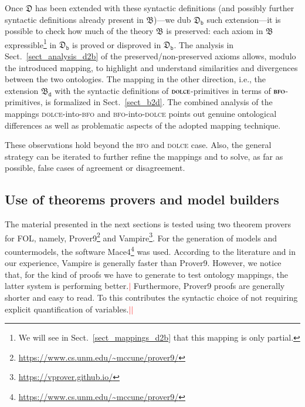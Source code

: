 \documentclass[ao]{iosart2x}
\newcommand{\nb}[1]{\textcolor{red}{$|$}\marginpar{\hspace*{-0cm}\parbox{20mm}{\scriptsize\raggedright\textcolor{red}{#1}}}}
\newcommand{\dolce}{{\textsc{dolce}}}
\newcommand{\bfo}{{\textsc{bfo}}}
\newcommand {\thdolce} {\ensuremath{\mathfrak{D}}}
\newcommand {\thbfo} {\ensuremath{\mathfrak{B}}}
\newcommand {\thbfobdmap} {\ensuremath{\mathfrak{B}_\texttt{d}}}
\newcommand {\thdolcedbmap} {\ensuremath{\mathfrak{D}_\texttt{b}}}
\begin{document}
Once {$\thdolce$} has been extended with these syntactic definitions (and possibly further syntactic definitions already present in {$\thbfo$})---we dub $\thdolcedbmap$ such extension---it is possible to check how much of the theory $\thbfo$ is preserved: each axiom in $\thbfo$ expressible\footnote{We will see in Sect.~\ref{sect_mappings_d2b} that this mapping is only partial.} in $\thdolcedbmap$ is proved or disproved in $\thdolcedbmap$. The analysis in Sect.~\ref{sect_analysis_d2b} of the preserved/non-preserved axioms allows, modulo the introduced mapping, to highlight and understand similarities and divergences between the two ontologies. The mapping in the other direction, i.e., the extension $\thbfobdmap$ with the syntactic definitions of {$\dolce$}-primitives in terms of {$\bfo$}-primitives, is formalized in Sect.~\ref{sect_b2d}. The combined analysis of the mappings {\dolce}-into-{\bfo} and {\bfo}-into-{\dolce} points out genuine ontological differences as well as problematic aspects of the adopted mapping technique. 

These observations hold beyond the {\bfo} and {\dolce} case. Also, the general strategy can be iterated to further refine the mappings and to solve, as far as possible, false cases of agreement or disagreement.

\subsection{Use of theorems provers and model builders}

The material presented in the next sections is tested using two theorem provers for FOL, namely, Prover9\footnote{\url{https://www.cs.unm.edu/~mccune/prover9/}} and Vampire\footnote{\url{https://vprover.github.io/}}. For the generation of models and countermodels, the software Mace4\footnote{\url{https://www.cs.unm.edu/~mccune/prover9/}} was used.
According to the literature \citep{Sut16} and in our experience, Vampire is generally faster than Prover9. However, we notice that, for the kind of proofs we have to generate to test ontology mappings, the latter system is performing better.\nb{CM: @Francesco, forse spiegare meglio in che senso è meglio} Furthermore, Prover9 proofs are generally shorter and easy to read. To this contributes the syntactic choice of not requiring explicit quantification of variables.\nb{CM: non sono sicuro di capire, nel senso che non si riportano i quantificatore per le variabili univ. quantificate?}\nb{SB: ho indebolito, da ricontrollare}
\end{document}
